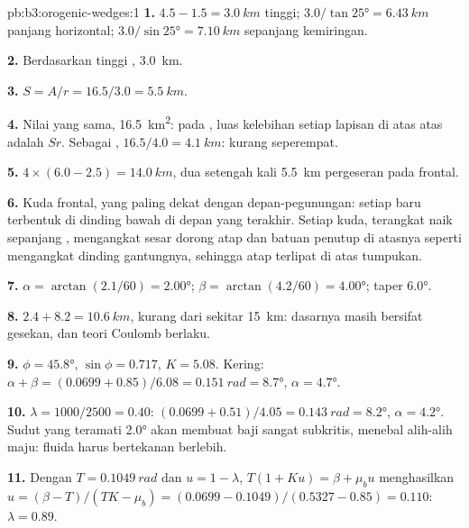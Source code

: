 \begin{solution}{pb:b3:orogenic-wedges:1}
\textbf{1.} $4.5 - 1.5 = \qty{3.0}{km}$ tinggi; $3.0/\tan\ang{25} =
\qty{6.43}{km}$ panjang horizontal; $3.0/\sin\ang{25} = \qty{7.10}{km}$ sepanjang
kemiringan.

\textbf{2.} Berdasarkan tinggi , \qty{3.0}{km}.

\textbf{3.} $S = A/r = 16.5/3.0 = \qty{5.5}{km}$.

\textbf{4.} Nilai yang sama, \qty{16.5}{km^2}: pada , luas kelebihan
setiap lapisan di atas  atas adalah $Sr$. Sebagai , $16.5/4.0 =
\qty{4.1}{km}$: kurang seperempat.

\textbf{5.} $4\times(6.0 - 2.5) = \qty{14.0}{km}$, dua setengah kali
\qty{5.5}{km} pergeseran pada  frontal.

\textbf{6.} Kuda frontal, yang paling dekat dengan depan-pegunungan: setiap  baru
terbentuk di dinding bawah di depan yang terakhir. Setiap kuda, terangkat naik sepanjang ,
mengangkat sesar dorong atap dan batuan penutup di atasnya seperti  mengangkat
dinding gantungnya, sehingga atap terlipat di atas tumpukan.

\textbf{7.} $\alpha = \arctan(2.1/60) = \ang{2.00}$; $\beta =
\arctan(4.2/60) = \ang{4.00}$; taper \ang{6.0}.

\textbf{8.} $2.4 + 8.2 = \qty{10.6}{km}$, kurang dari sekitar \qty{15}{km}: dasarnya
masih bersifat gesekan, dan teori Coulomb berlaku.

\textbf{9.} $\phi = \ang{45.8}$, $\sin\phi = 0.717$, $K = 5.08$. Kering:
$\alpha + \beta = (0.0699 + 0.85)/6.08 = \qty{0.151}{rad} = \ang{8.7}$,
$\alpha = \ang{4.7}$.

\textbf{10.} $\lambda = 1000/2500 = 0.40$: $(0.0699 + 0.51)/4.05 =
\qty{0.143}{rad} = \ang{8.2}$, $\alpha = \ang{4.2}$. Sudut yang teramati \ang{2.0}
akan membuat baji sangat subkritis, menebal alih-alih maju:
fluida harus bertekanan berlebih.

\textbf{11.} Dengan $T = \qty{0.1049}{rad}$ dan $u = 1 - \lambda$, $T(1 + Ku) =
\beta + \mu_bu$ menghasilkan $u = (\beta - T)/(TK - \mu_b) = (0.0699 -
0.1049)/(0.5327 - 0.85) = 0.110$: $\lambda = 0.89$.


\end{solution}
